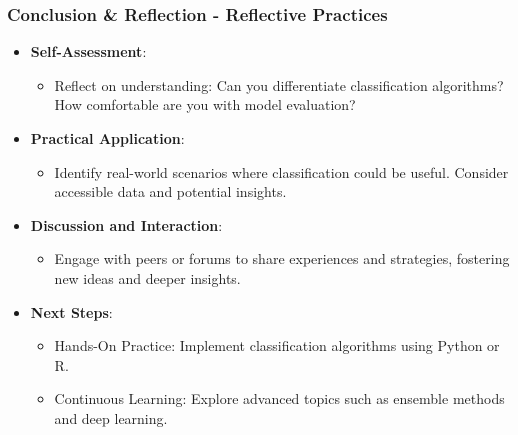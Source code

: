 \documentclass[aspectratio=169]{beamer}
\begin{document}
\begin{frame}[fragile]
    \frametitle{Conclusion \& Reflection - Reflective Practices}
    \begin{itemize}
        \item \textbf{Self-Assessment}:
        \begin{itemize}
            \item Reflect on understanding: Can you differentiate classification algorithms? How comfortable are you with model evaluation?
        \end{itemize}

        \item \textbf{Practical Application}:
        \begin{itemize}
            \item Identify real-world scenarios where classification could be useful. Consider accessible data and potential insights.
        \end{itemize}

        \item \textbf{Discussion and Interaction}:
        \begin{itemize}
            \item Engage with peers or forums to share experiences and strategies, fostering new ideas and deeper insights.
        \end{itemize}

        \item \textbf{Next Steps}:
        \begin{itemize}
            \item Hands-On Practice: Implement classification algorithms using Python or R. 
            \item Continuous Learning: Explore advanced topics such as ensemble methods and deep learning.
        \end{itemize}
    \end{itemize}
\end{frame}
\end{document}
